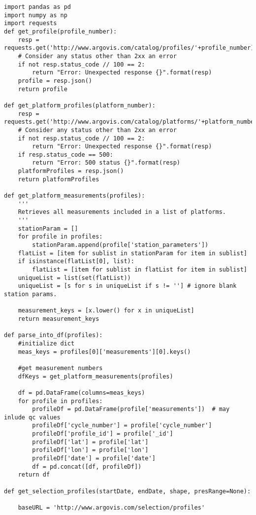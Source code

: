 \begin{lstlisting}[label={lst:api} caption=Python API to www.argovis.com]
import pandas as pd
import numpy as np
import requests
def get_profile(profile_number):
    resp = requests.get('http://www.argovis.com/catalog/profiles/'+profile_number)
    # Consider any status other than 2xx an error
    if not resp.status_code // 100 == 2:
        return "Error: Unexpected response {}".format(resp)
    profile = resp.json()
    return profile
    
def get_platform_profiles(platform_number):
    resp = requests.get('http://www.argovis.com/catalog/platforms/'+platform_number)
    # Consider any status other than 2xx an error
    if not resp.status_code // 100 == 2:
        return "Error: Unexpected response {}".format(resp)
    if resp.status_code == 500:
        return "Error: 500 status {}".format(resp)
    platformProfiles = resp.json()
    return platformProfiles

def get_platform_measurements(profiles):
    '''
    Retrieves all measurements included in a list of platforms.
    '''
    stationParam = []
    for profile in profiles:
        stationParam.append(profile['station_parameters'])
    flatList = [item for sublist in stationParam for item in sublist]
    if isinstance(flatList[0], list):
        flatList = [item for sublist in flatList for item in sublist]
    uniqueList = list(set(flatList))
    uniqueList = [s for s in uniqueList if s != ''] # ignore blank station params.
                
    measurement_keys = [x.lower() for x in uniqueList]   
    return measurement_keys

def parse_into_df(profiles):
    #initialize dict
    meas_keys = profiles[0]['measurements'][0].keys()
    
    #get measurement numbers
    dfKeys = get_platform_measurements(profiles)

    df = pd.DataFrame(columns=meas_keys)
    for profile in profiles:
        profileDf = pd.DataFrame(profile['measurements'])  # may inlude qc values
        profileDf['cycle_number'] = profile['cycle_number']
        profileDf['profile_id'] = profile['_id']
        profileDf['lat'] = profile['lat']
        profileDf['lon'] = profile['lon']
        profileDf['date'] = profile['date']
        df = pd.concat([df, profileDf])
    return df

def get_selection_profiles(startDate, endDate, shape, presRange=None):
    
    baseURL = 'http://www.argovis.com/selection/profiles'
    

\end{lstlisting}
